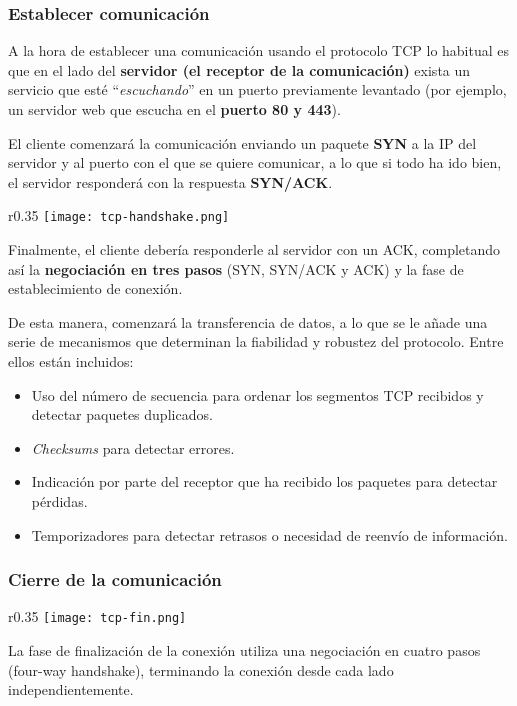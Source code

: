 \subsubsection{Establecer comunicación}
A la hora de establecer una comunicación usando el protocolo TCP lo habitual es que en el lado del \textbf{servidor (el receptor de la comunicación)} exista un servicio que esté “\textit{escuchando}” en un puerto previamente levantado (por ejemplo, un servidor web que escucha en el \textbf{puerto 80 y 443}).

El cliente comenzará la comunicación enviando un paquete \textbf{SYN} a la IP del servidor y al puerto con el que se quiere comunicar, a lo que si todo ha ido bien, el servidor responderá con la respuesta \textbf{SYN/ACK}.
\begin{wrapfigure}{r}{0.35\linewidth}
    \hfill
    \vspace{-30pt}
    \texttt{[image: tcp-handshake.png]}
    \vspace{-10pt}
\end{wrapfigure}

Finalmente, el cliente debería responderle al servidor con un ACK, completando así la \textbf{negociación en tres pasos} (SYN, SYN/ACK y ACK) y la fase de establecimiento de conexión.

De esta manera, comenzará la transferencia de datos, a lo que se le añade una serie de mecanismos que determinan la fiabilidad y robustez del protocolo. Entre ellos están incluidos:


\begin{itemize}
    \item Uso del número de secuencia para ordenar los segmentos TCP recibidos y detectar paquetes duplicados.
    \item \textit{Checksums} para detectar errores.
    \item Indicación por parte del receptor que ha recibido los paquetes para detectar pérdidas.
    \item Temporizadores para detectar retrasos o necesidad de reenvío de información.
\end{itemize}


\subsubsection{Cierre de la comunicación}
\begin{wrapfigure}{r}{0.35\linewidth}
    \hfill
    \texttt{[image: tcp-fin.png]}
    \vspace{-10pt}
\end{wrapfigure}
La fase de finalización de la conexión utiliza una negociación en cuatro pasos (four-way handshake), terminando la conexión desde cada lado independientemente.


